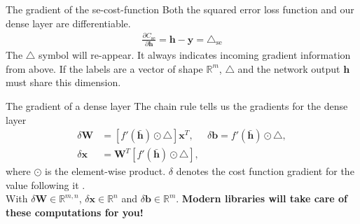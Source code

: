 \documentclass{beamer}
\begin{document}
    \begin{frame}{The gradient of the se-cost-function}
      Both the squared error loss function and our dense layer are differentiable. 
      \begin{align}
        \frac{\partial C_{\text{se}}}{\partial \mathbf{h}} = \mathbf{h} - \mathbf{y} = \triangle_{\text{se}}
      \end{align}
      The $\triangle$ symbol will re-appear. It always indicates incoming gradient information from above.
      If the labels are a vector of shape $\mathbb{R}^m$, $\triangle$ and the network output $\mathbf{h}$ must share 
      this dimension.
    \end{frame}

    \begin{frame}{The gradient of a dense layer}
      The chain rule tells us the gradients for the dense layer~\cite{nielsen2015neural}
      \begin{align}
        \delta \mathbf{W} &= [f'(\bar{\mathbf{h}}) \odot \triangle]\mathbf{x}^T, &  \delta \mathbf{b} = f'(\bar{\mathbf{h}}) \odot \triangle, \\
        \delta \mathbf{x} &= \mathbf{W}^T [f'(\bar{\mathbf{h}}) \odot \triangle],
      \end{align}
      where $\odot$ is the element-wise product. $\delta$ denotes the cost function gradient for the value following it \cite{greff2016lstm}. \\
      With $\delta \mathbf{W} \in \mathbb{R}^{m,n}$, $\delta \mathbf{x} \in \mathbb{R}^{n}$ and $\delta \mathbf{b} \in \mathbb{R}^{m}$.
      \textbf{Modern libraries will take care of these computations for you!} \\
      
    \end{frame}
\end{document}
